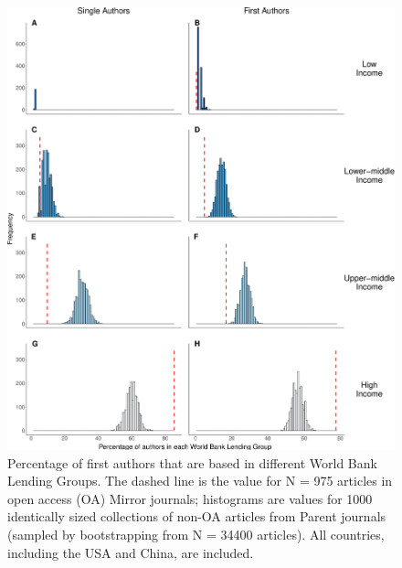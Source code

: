 \documentclass[
  english,
  man]{apa6}
\begin{document}
\begin{figure}

{\centering \includegraphics{Smith_etal_QSS_files/figure-latex/Fig5-1} 

}

\caption{Percentage of first authors that are based in different World Bank Lending Groups. The dashed line is the value for N =  975  articles in open access (OA) Mirror journals; histograms are values for 1000 identically sized collections of non-OA articles from Parent journals (sampled by bootstrapping from N =  34400  articles). All countries, including the USA and China, are included.}\label{fig:Fig5}
\end{figure}
\end{document}
